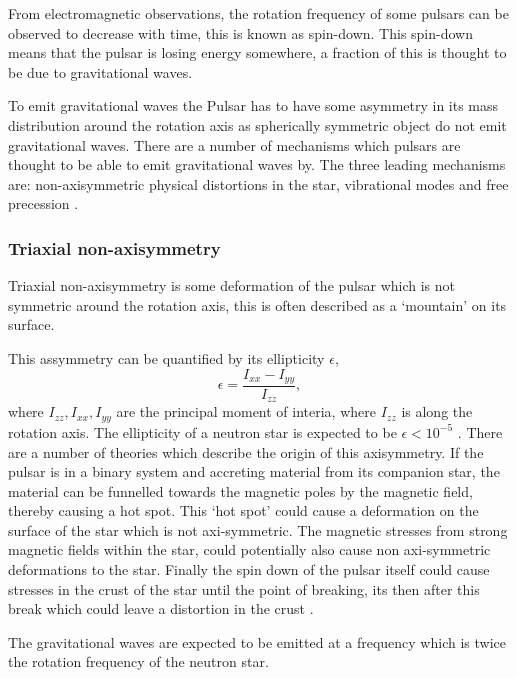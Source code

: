 From electromagnetic observations, the rotation frequency of some pulsars can be observed to decrease with time, this is known as spin-down.
This spin-down means that the pulsar is losing energy somewhere, a fraction of this is thought to be due to gravitational waves. 

To emit gravitational waves the Pulsar has to have some asymmetry in its mass distribution around the rotation axis as spherically symmetric object do not emit gravitational waves.
There are a number of mechanisms which pulsars are thought to be able to emit gravitational waves by. The three leading mechanisms are: non-axisymmetric physical distortions in the star, vibrational modes and free precession \citep{Becker2009}.

\subsubsection{Triaxial non-axisymmetry}

Triaxial non-axisymmetry is some deformation of the pulsar which is not symmetric around the rotation axis, this is often described as a `mountain' on its surface.

This assymmetry can be quantified by its ellipticity $\epsilon$,
\begin{equation}
\label{ellipticity}
\epsilon = \frac{I_{xx}-I_{yy}}{I_{zz}},
\end{equation}
where $I_{zz},I_{xx},I_{yy}$ are the principal moment of interia, where $I_{zz}$ is along the rotation axis. 
The ellipticity of a neutron star is expected to be $ \epsilon<10^{-5}$ \citep{Becker2009}. 
There are a number of theories which describe the origin of this axisymmetry.
If the pulsar is in a binary system and accreting material from its companion star, the material can be funnelled towards the magnetic poles by the magnetic field, thereby causing a hot spot.
This `hot spot' could cause a deformation on the surface of the star which is not axi-symmetric. 
The magnetic stresses from strong magnetic fields within the star, could potentially also cause non axi-symmetric deformations to the star.
Finally the spin down of the pulsar itself could cause stresses in the crust of the star until the point of breaking, its then after this break which could leave a distortion in the crust \citep{Becker2009}.

The gravitational waves are expected to be emitted at a frequency which is twice the rotation frequency of the neutron star.
 
